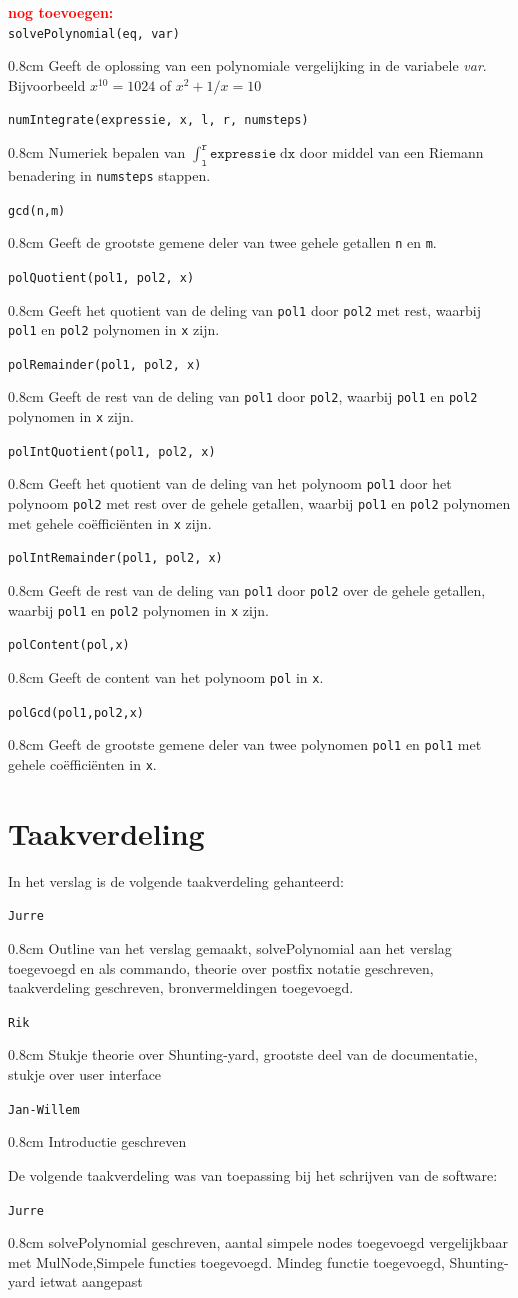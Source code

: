 \documentclass[a4paper]{article}
\newcommand{\rcom}[1]{\textbf{\textcolor{red}{#1}}}
\newcommand{\com}[2]{\texttt{#1}\mbox{}\vspace{-2ex}\begin{adjustwidth}{0.8cm}{} #2 \end{adjustwidth}}
\begin{document}
\rcom{nog toevoegen:\\}
\com{solvePolynomial(eq, var)}{Geeft de oplossing van een polynomiale vergelijking in de variabele \textit{var}. Bijvoorbeeld $x^{10} = 1024$ of $x^2 + 1/x = 10$}
\com{numIntegrate(expressie, x, l, r, numsteps)}{Numeriek bepalen van $\int_{\texttt{l}}^\texttt{r} \texttt{expressie} \; \mathrm{d}\texttt{x}$ door middel van een Riemann benadering in \texttt{numsteps} stappen.}
\com{gcd(n,m)}{Geeft de grootste gemene deler van twee gehele getallen \texttt{n} en \texttt{m}.}
\com{polQuotient(pol1, pol2, x)}{Geeft het quotient van de deling van \texttt{pol1} door \texttt{pol2} met rest, waarbij \texttt{pol1} en \texttt{pol2} polynomen in \texttt{x} zijn.}
\com{polRemainder(pol1, pol2, x)}{Geeft de rest van de deling van \texttt{pol1} door \texttt{pol2}, waarbij \texttt{pol1} en \texttt{pol2} polynomen in \texttt{x} zijn.}
\com{polIntQuotient(pol1, pol2, x)}{Geeft het quotient van de deling van het polynoom \texttt{pol1} door het polynoom \texttt{pol2} met rest over de gehele getallen, waarbij \texttt{pol1} en \texttt{pol2} polynomen met gehele co\"effici\"enten in \texttt{x} zijn.}
\com{polIntRemainder(pol1, pol2, x)}{Geeft de rest van de deling van \texttt{pol1} door \texttt{pol2} over de gehele getallen, waarbij \texttt{pol1} en \texttt{pol2} polynomen in \texttt{x} zijn.}
\com{polContent(pol,x)}{Geeft de content van het polynoom \texttt{pol} in \texttt{x}.}
\com{polGcd(pol1,pol2,x)}{Geeft de grootste gemene deler van twee polynomen \texttt{pol1} en \texttt{pol1} met gehele co\"effici\"enten in \texttt{x}.}


\section{Taakverdeling}
In het verslag is de volgende taakverdeling gehanteerd:

\com{Jurre} {Outline van het verslag gemaakt, solvePolynomial aan het verslag toegevoegd en als commando, theorie over postfix notatie geschreven, taakverdeling geschreven, bronvermeldingen toegevoegd.}

\com{Rik} {Stukje theorie over Shunting-yard, grootste deel van de documentatie, stukje over user interface}
\com{Jan-Willem} {Introductie geschreven}

De volgende taakverdeling was van toepassing bij het schrijven van de software:

\com{Jurre} {solvePolynomial geschreven, aantal simpele nodes toegevoegd vergelijkbaar met MulNode,Simpele functies toegevoegd. Mindeg functie toegevoegd, Shunting-yard ietwat aangepast}
\end{document}
